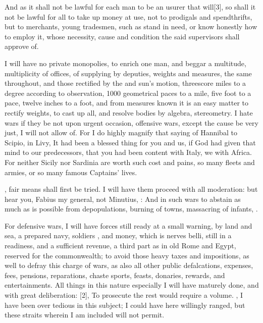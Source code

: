 And as it shall not be lawful for each man to be an usurer that
will[3\baselineskip], so shall it not be lawful for all to take up money at use, not to
prodigals and spendthrifts, but to merchants, young tradesmen, such as
stand in need, or know honestly how to employ it, whose necessity,
cause and condition the said supervisors shall approve of.

I will have no private monopolies, to enrich one man, and beggar a
multitude, multiplicity of offices, of supplying by deputies,
weights and measures, the same throughout, and those rectified by the
 and sun's motion, threescore miles to a degree according
to observation, 1000 geometrical paces to a mile, five foot to a pace,
twelve inches to a foot, \etc{} and from measures known it is an easy
matter to rectify weights, \etc{} to cast up all, and resolve bodies by
algebra, stereometry. I hate wars if they be not  upon
urgent occasion, 
offensive wars, except the cause be very just, I will not allow
of. For I do highly magnify that saying of Hannibal to Scipio, in
Livy, It had been a blessed thing for you and us, if God had given
that mind to our predecessors, that you had been content with Italy, we
with Africa. For neither Sicily nor Sardinia are worth such cost and
pains, so many fleets and armies, or so many famous Captains' lives.

, fair means shall first be tried.  I will have them proceed
with all moderation: but hear you, Fabius my general, not Minutius, : And in such wars to abstain as much as is possible
from depopulations, burning of towns, massacring of infants, \etc{}.

For defensive wars, I will have forces still ready at a small warning,
by land and sea, a prepared navy, soldiers , and money,
which is nerves belli, still in a readiness, and a sufficient revenue,
a third part as in old Rome and Egypt, reserved for the
commonwealth; to avoid those heavy taxes and impositions, as well to
defray this charge of wars, as also all other public defalcations,
expenses, fees, pensions, reparations, chaste sports, feasts, donaries,
rewards, and entertainments. All things in this nature especially I
will have maturely done, and with great deliberation: [2\baselineskip], 
To prosecute the rest would require a volume. , I have
been over tedious in this subject; I could have here willingly ranged,
but these straits wherein I am included will not permit.

